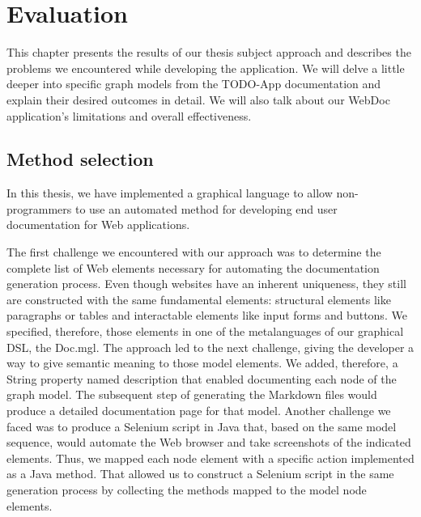 \chapter{Evaluation}\label{ch:eval}

This chapter presents the results of our thesis subject approach and describes the problems we encountered while developing the application. We will delve a little deeper into specific graph models from the TODO-App documentation and explain their desired outcomes in detail. We will also talk about our WebDoc application's limitations and overall effectiveness.

\section{Method selection}\label{sec:meth}

In this thesis, we have implemented a graphical language to allow non-programmers to use an automated method for developing end user documentation for Web applications.

The first challenge we encountered with our approach was to determine the complete list of Web elements necessary for automating the documentation generation process. Even though websites have an inherent uniqueness, they still are constructed with the same fundamental elements: structural elements like paragraphs or tables and interactable elements like input forms and buttons. We specified, therefore, those elements in one of the metalanguages of our graphical DSL, the Doc.mgl. The approach led to the next challenge, giving the developer a way to give semantic meaning to those model elements. We added, therefore, a String property named description that enabled documenting each node of the graph model. The subsequent step of generating the Markdown files would produce a detailed documentation page for that model.
Another challenge we faced was to produce a Selenium script in Java that, based on the same model sequence, would automate the Web browser and take screenshots of the indicated elements. Thus, we mapped each node element with a specific action implemented as a Java method. That allowed us to construct a Selenium script in the same generation process by collecting the methods mapped to the model node elements.

